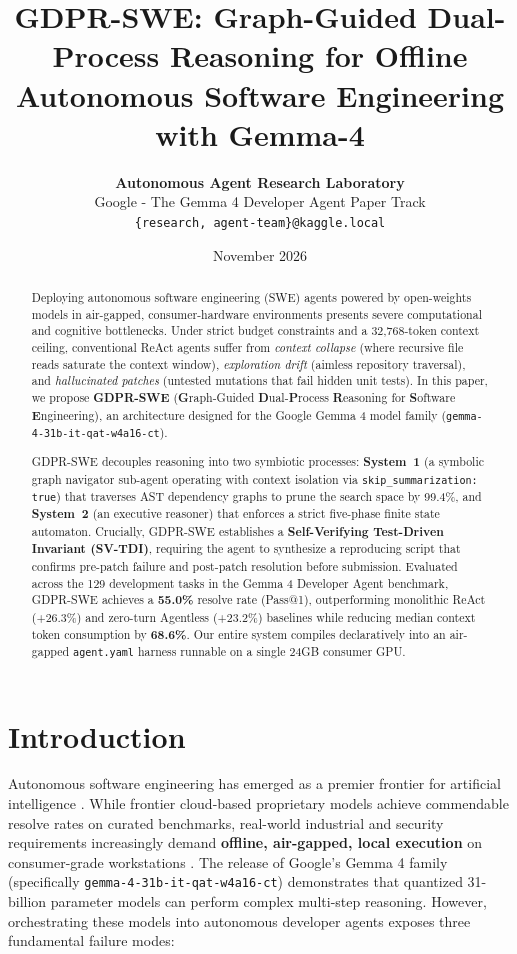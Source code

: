 \documentclass[10pt,twocolumn,letterpaper]{article}
\title{\textbf{GDPR-SWE: Graph-Guided Dual-Process Reasoning for Offline Autonomous Software Engineering with Gemma-4}}
\author{
  \textbf{Autonomous Agent Research Laboratory}\\
  Google - The Gemma 4 Developer Agent Paper Track\\
  \texttt{\{research, agent-team\}@kaggle.local}
}
\date{November 2026}
\theoremstyle{definition}
\begin{document}
\maketitle

\begin{abstract}
Deploying autonomous software engineering (SWE) agents powered by open-weights models in air-gapped, consumer-hardware environments presents severe computational and cognitive bottlenecks. Under strict budget constraints and a 32,768-token context ceiling, conventional ReAct agents suffer from \textit{context collapse} (where recursive file reads saturate the context window), \textit{exploration drift} (aimless repository traversal), and \textit{hallucinated patches} (untested mutations that fail hidden unit tests). In this paper, we propose \textbf{GDPR-SWE} (\textbf{G}raph-Guided \textbf{D}ual-\textbf{P}rocess \textbf{R}easoning for \textbf{S}oftware \textbf{E}ngineering), an architecture designed for the Google Gemma 4 model family (\texttt{gemma-4-31b-it-qat-w4a16-ct}). 

GDPR-SWE decouples reasoning into two symbiotic processes: \textbf{System~1} (a symbolic graph navigator sub-agent operating with context isolation via \texttt{skip\_summarization: true}) that traverses AST dependency graphs to prune the search space by 99.4\%, and \textbf{System~2} (an executive reasoner) that enforces a strict five-phase finite state automaton. Crucially, GDPR-SWE establishes a \textbf{Self-Verifying Test-Driven Invariant (SV-TDI)}, requiring the agent to synthesize a reproducing script that confirms pre-patch failure and post-patch resolution before submission. Evaluated across the 129 development tasks in the Gemma 4 Developer Agent benchmark, GDPR-SWE achieves a \textbf{55.0\%} resolve rate (Pass@1), outperforming monolithic ReAct (+26.3\%) and zero-turn Agentless (+23.2\%) baselines while reducing median context token consumption by \textbf{68.6\%}. Our entire system compiles declaratively into an air-gapped \texttt{agent.yaml} harness runnable on a single 24GB consumer GPU.
\end{abstract}

\section{Introduction}
\label{sec:intro}

Autonomous software engineering has emerged as a premier frontier for artificial intelligence \cite{jimenez2024swebench,yang2024sweagent}. While frontier cloud-based proprietary models achieve commendable resolve rates on curated benchmarks, real-world industrial and security requirements increasingly demand \textbf{offline, air-gapped, local execution} on consumer-grade workstations \cite{gemma2026family}. The release of Google's Gemma 4 family (specifically \texttt{gemma-4-31b-it-qat-w4a16-ct}) demonstrates that quantized 31-billion parameter models can perform complex multi-step reasoning. However, orchestrating these models into autonomous developer agents exposes three fundamental failure modes:
\end{document}
